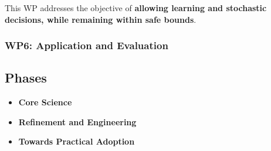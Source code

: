 This WP addresses the objective of  \textbf{allowing learning and stochastic decisions, while remaining within safe bounds}.


\subsubsection*{WP6: Application and Evaluation}



\subsection{Phases}
\begin{itemize}
\item \textbf{Core Science}
\item \textbf{Refinement and Engineering}
\item \textbf{Towards Practical Adoption}
\end{itemize}








\endinput










We discuss each of them in details below.

\subsection{ADDRESSING OBJECTIVES}


\subsubsection{Addressing objective 1: Make white-box self-programming mechanisms
  comprehensible to humans.}

The key property of white-box self-programming mechanisms is the
ability of describing their specification, the programs they generate
and the relationship between the two in human terms.

To do so the domain where the mechanism operates, the 
mechanism itself, its capabilities and limitations, as well as
its specifications and goals need to be formally described in terms of concepts that
can be shared with humans.

\project will consider this issue upfront, by founding white-box self-programming mechanisms on the area of AI called \textbf{Knowledge Representation}. 

